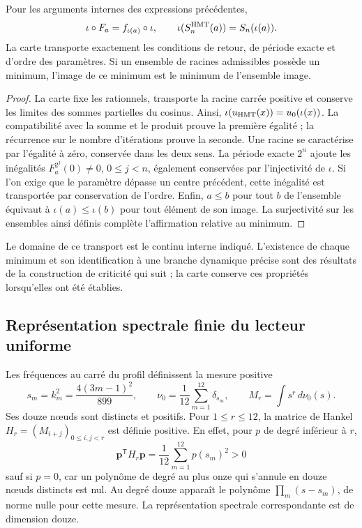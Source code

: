 \begin{proposition}
\label{hmtfg:conjugacion-selector}
Pour les arguments internes des expressions précédentes,
\[
 \iota\circ F_a=f_{\iota(a)}\circ\iota,\qquad
 \iota(S_n^{\rm HMT}(a))=S_n(\iota(a)).
\]
La carte transporte exactement les conditions de retour, de période exacte et d’ordre des paramètres. Si un ensemble de racines admissibles possède un minimum, l’image de ce minimum est le minimum de l’ensemble image.
\end{proposition}
\begin{proof}
La carte fixe les rationnels, transporte la racine carrée positive et conserve les limites des sommes partielles du cosinus. Ainsi, \(\iota(u_{\rm HMT}(x))=u_0(\iota(x))\). La compatibilité avec la somme et le produit prouve la première égalité ; la récurrence sur le nombre d’itérations prouve la seconde. Une racine se caractérise par l’égalité à zéro, conservée dans les deux sens. La période exacte \(2^n\) ajoute les inégalités \(F_a^{2^j}(0)\ne0\), \(0\le j<n\), également conservées par l’injectivité de \(\iota\). Si l’on exige que le paramètre dépasse un centre précédent, cette inégalité est transportée par conservation de l’ordre. Enfin, \(a\le b\) pour tout \(b\) de l’ensemble équivaut à \(\iota(a)\le\iota(b)\) pour tout élément de son image. La surjectivité sur les ensembles ainsi définis complète l’affirmation relative au minimum.
\end{proof}

Le domaine de ce transport est le continu interne indiqué. L’existence de chaque minimum et son identification à une branche dynamique précise sont des résultats de la construction de criticité qui suit ; la carte conserve ces propriétés lorsqu’elles ont été établies.

\subsection{Représentation spectrale finie du lecteur uniforme}
\label{hmtfg:jacobi-finito}

Les fréquences au carré du profil définissent la mesure positive
\[
 s_m=k_m^2=\frac{4(3m-1)^2}{899},\qquad
 \nu_0=\frac1{12}\sum_{m=1}^{12}\delta_{s_m},\qquad
 M_r=\int s^r\,d\nu_0(s).
\]
Ses douze nœuds sont distincts et positifs. Pour \(1\le r\le12\), la matrice de Hankel \(H_r=(M_{i+j})_{0\le i,j<r}\) est définie positive. En effet, pour \(p\) de degré inférieur à \(r\),
\[
 \mathbf p^{\mathsf T}H_r\mathbf p
   =\frac1{12}\sum_{m=1}^{12}p(s_m)^2>0
\]
sauf si \(p=0\), car un polynôme de degré au plus onze qui s’annule en douze nœuds distincts est nul. Au degré douze apparaît le polynôme \(\prod_m(s-s_m)\), de norme nulle pour cette mesure. La représentation spectrale correspondante est de dimension douze.

